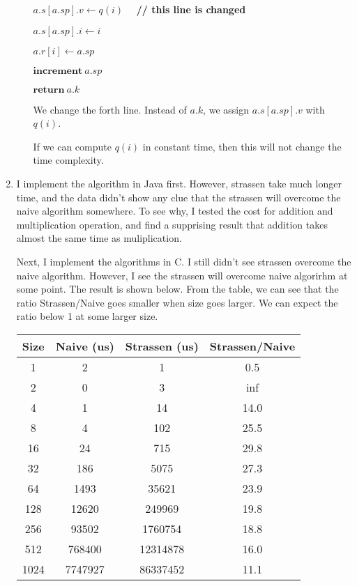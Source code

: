 \documentclass[11pt,letterpaper,oneside]{article}
\begin{document}
\begin{enumerate}
\begin{enumerate}
\hspace{3em}    $a.s[a.sp].v \leftarrow q(i)$  \ \ \textbf{// this line is changed}

\hspace{3em}    $a.s[a.sp].i \leftarrow i$ 

\hspace{3em}    $a.r[i] \leftarrow a.sp$

\hspace{3em}    $\textbf{increment}\ a.sp$

\hspace{3em}    $\textbf{return}\ a.k$

\null

We change the forth line. Instead of $a.k$, we assign $a.s[a.sp].v$ with $q(i)$.

If we can compute $q(i)$ in constant time, then this will not change the time complexity.

\end{enumerate}

\item I implement the algorithm in Java first. However, strassen take much longer time, and the data didn't show any clue that the strassen will overcome the naive algorithm somewhere. To see why, I tested the cost for addition and multiplication operation, and find a supprising result that addition takes almost the same time as muliplication.

Next, I implement the algorithms in C. I still didn't see strassen overcome the naive algorithm. However, I see the strassen will overcome naive algorirhm at some point. The result is shown below. From the table, we can see that the ratio Strassen/Naive goes smaller when size goes larger. We can expect the ratio below 1 at some larger size.

\begin{tabular}{cccc}
Size & Naive (us) & Strassen (us) & Strassen/Naive\\ \hline
1& 2& 1& 0.5\\
2& 0& 3& inf\\
4& 1& 14& 14.0\\
8& 4& 102& 25.5\\
16& 24& 715& 29.8\\
32& 186& 5075& 27.3\\
64& 1493& 35621& 23.9\\
128& 12620& 249969& 19.8\\
256& 93502& 1760754& 18.8\\
512& 768400& 12314878& 16.0\\
1024& 7747927& 86337452& 11.1\\
\end{tabular}


\end{enumerate}
\end{document}
